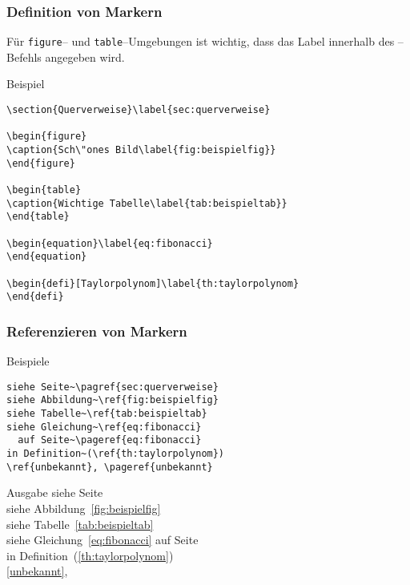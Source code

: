 \begin{frame}[c,fragile]
\frametitle{Definition von Markern}

F\"ur \texttt{figure}-- und \texttt{table}--Umgebungen ist wichtig, dass das Label innerhalb des --Befehls angegeben wird.

\begin{block}{Beispiel}
\begin{verbatim}
\section{Querverweise}\label{sec:querverweise}

\begin{figure}
\caption{Sch\"ones Bild\label{fig:beispielfig}}
\end{figure}

\begin{table}
\caption{Wichtige Tabelle\label{tab:beispieltab}}
\end{table}

\begin{equation}\label{eq:fibonacci}
\end{equation}

\begin{defi}[Taylorpolynom]\label{th:taylorpolynom}
\end{defi}
\end{verbatim}

\end{block}

\end{frame}

\begin{frame}[c,fragile]
\frametitle{Referenzieren von Markern}

\begin{block}{Beispiele}
\begin{verbatim}
siehe Seite~\pagref{sec:querverweise}
siehe Abbildung~\ref{fig:beispielfig}
siehe Tabelle~\ref{tab:beispieltab}
siehe Gleichung~\ref{eq:fibonacci}
  auf Seite~\pageref{eq:fibonacci}
in Definition~(\ref{th:taylorpolynom})
\ref{unbekannt}, \pageref{unbekannt}
\end{verbatim}
\end{block}

\begin{block}{Ausgabe}
siehe Seite~\pageref{sec:querverweise} \\
siehe Abbildung~\ref{fig:beispielfig} \\
siehe Tabelle~\ref{tab:beispieltab} \\
siehe Gleichung~\ref{eq:fibonacci} auf Seite~\pageref{eq:fibonacci} \\
in Definition~(\ref{th:taylorpolynom}) \\
\ref{unbekannt}, \pageref{unbekannt}
\end{block}

\end{frame}

